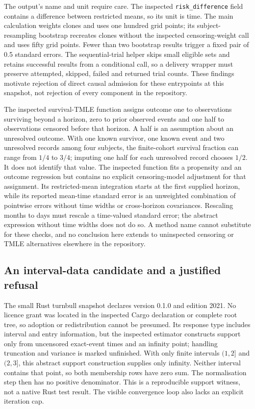 The output's name and unit require care. The inspected
\texttt{risk\_difference} field contains a difference between restricted means,
so its unit is time. The main calculation weights clones and uses one hundred
grid points; its subject-resampling bootstrap recreates clones without the inspected
censoring-weight call and uses fifty grid points. Fewer than two bootstrap results
trigger a fixed pair of 0.5 standard errors. The sequential-trial helper skips
small eligible sets and retains successful results from a conditional call, so a
delivery wrapper must preserve attempted, skipped, failed and returned trial counts.
These findings motivate rejection of direct causal admission for these entrypoints
at this snapshot, not rejection of every component in the repository.
\citep{exec24_survivalother_rustcore}

The inspected survival-TMLE function assigns outcome one to observations surviving
beyond a horizon, zero to prior observed events and one half to observations censored
before that horizon. A half is an assumption about an unresolved outcome. With one
known survivor, one known event and two unresolved records among four subjects, the
finite-cohort survival fraction can range from $1/4$ to $3/4$; imputing one half for
each unresolved record chooses $1/2$. It does not identify that value. The inspected
function fits a propensity and an outcome regression but contains no explicit
censoring-model adjustment for that assignment. Its restricted-mean integration starts
at the first supplied horizon, while its reported mean-time standard error is an
unweighted combination of pointwise errors without time widths or cross-horizon
covariances. Rescaling months to days must rescale a time-valued standard error;
the abstract expression without time widths does not do so. A method name cannot
substitute for these checks, and no conclusion here extends to uninspected censoring
or TMLE alternatives elsewhere in the repository.
\citep{exec24_survivalother_rustcore,exec24_survivalother_reference}

\subsection{An interval-data candidate and a justified refusal}
The small Rust turnbull snapshot declares version 0.1.0 and edition 2021. No licence
grant was located in the inspected Cargo declaration or complete root tree, so
adoption or redistribution cannot be presumed. Its response type includes interval
and entry information, but the inspected estimator constructs support only from
uncensored exact-event times and an infinity point; handling truncation and variance
is marked unfinished. With only finite intervals $(1,2]$ and $(2,3]$, this abstract
support construction supplies only infinity. Neither interval contains that point,
so both membership rows have zero sum. The normalisation step then has no positive
denominator. This is a reproducible support witness, not a native Rust test result.
The visible convergence loop also lacks an explicit iteration cap.
\citep{exec24_survivalother_rustturnbull,exec24_survivalother_reference}

